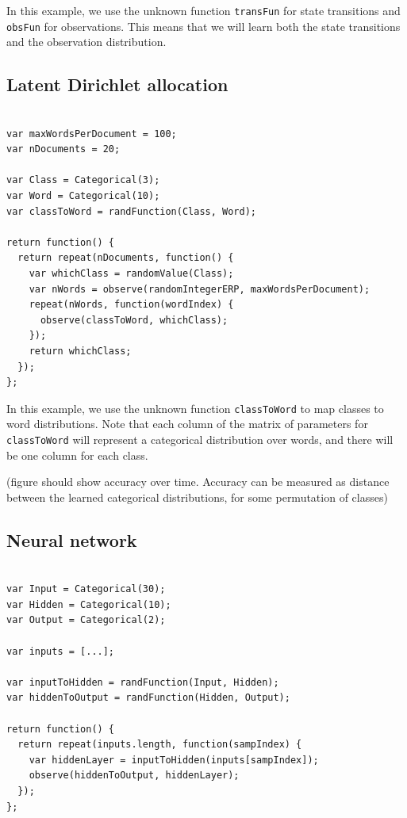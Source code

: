 \documentclass{article}
\begin{document}
In this example, we use the unknown function \texttt{transFun} for state transitions and \texttt{obsFun} for observations.  This means that we will learn both the state transitions and the observation distribution.


\subsection{Latent Dirichlet allocation}
{\small
\begin{verbatim}

var maxWordsPerDocument = 100;
var nDocuments = 20;

var Class = Categorical(3);
var Word = Categorical(10);
var classToWord = randFunction(Class, Word);

return function() {
  return repeat(nDocuments, function() {
    var whichClass = randomValue(Class);
    var nWords = observe(randomIntegerERP, maxWordsPerDocument);
    repeat(nWords, function(wordIndex) {
      observe(classToWord, whichClass);
    });
    return whichClass;
  });
};

\end{verbatim}
}

In this example, we use the unknown function \texttt{classToWord} to map classes to word distributions.  Note that each column of the matrix of parameters for \texttt{classToWord} will represent a categorical distribution over words, and there will be one column for each class.

(figure should show accuracy over time.  Accuracy can be measured as distance between the learned categorical distributions, for some permutation of classes)

\subsection{Neural network}

{\small
\begin{verbatim}

var Input = Categorical(30);
var Hidden = Categorical(10);
var Output = Categorical(2);

var inputs = [...];

var inputToHidden = randFunction(Input, Hidden);
var hiddenToOutput = randFunction(Hidden, Output);

return function() {
  return repeat(inputs.length, function(sampIndex) {
    var hiddenLayer = inputToHidden(inputs[sampIndex]);
    observe(hiddenToOutput, hiddenLayer);
  });
};
\end{verbatim}
}
\end{document}
